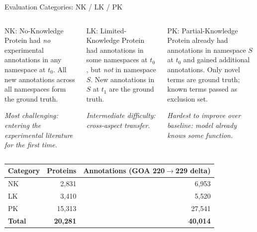 \documentclass[12pt, aspectratio=169]{beamer}
\begin{document}
\begin{frame}{Evaluation Categories: NK / LK / PK}
  \begin{columns}[t]
      \begin{block}{NK: No-Knowledge}
        Protein had \emph{no} experimental annotations in any namespace at $t_0$.
        All new annotations across all namespaces form the ground truth.
        \vspace{0.2em}

        \textit{Most challenging: entering the experimental literature for the first time.}
      \end{block}
      \begin{block}{LK: Limited-Knowledge}
        Protein had annotations in some namespaces at $t_0$, but \emph{not} in
        namespace $S$. New annotations in $S$ at $t_1$ are the ground truth.
        \vspace{0.2em}

        \textit{Intermediate difficulty: cross-aspect transfer.}
      \end{block}
      \begin{block}{PK: Partial-Knowledge}
        Protein already had annotations in namespace $S$ at $t_0$ and gained
        additional annotations. Only novel terms are ground truth; known terms
        passed as exclusion set.
        \vspace{0.2em}

        \textit{Hardest to improve over baseline: model already knows some function.}
      \end{block}
  \end{columns}
  \vspace{1em}
  \begin{center}
    \begin{tabular}{lrr}
      \toprule
      Category & Proteins & Annotations (GOA 220$\to$229 delta) \\
      \midrule
      NK & 2,831 & 6,953 \\
      LK & 3,410 & 5,520 \\
      PK & 15,313 & 27,541 \\
      \midrule
      \textbf{Total} & \textbf{20,281} & \textbf{40,014} \\
      \bottomrule
    \end{tabular}
  \end{center}
\end{frame}
\end{document}
